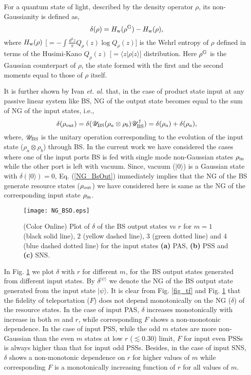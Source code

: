 \documentclass[letter,scriptaddress,twocolumn, prl,showkeys]{revtex4}
\begin{document}
For a quantum state of light, described by the density operator $\rho$, its non-Gaussianity is defined as,
\begin{equation}
\delta(\rho)=H_{\rm{w}}(\rho^{\rm{G}})-H_{\rm{w}}(\rho),
\label{def_ng}
\end{equation} 
where $H_{\rm{w}}(\rho)$ [$=-\int\frac{d^{2}z}{\pi}Q_{\rho}(z)\log Q_{\rho}(z)$] is the Wehrl entropy of $\rho$ defined in terms of the Husimi-Kano $Q_{\rho}(z)$ [$=\langle z|\rho|z\rangle$] distribution.
Here $\rho^{\rm{G}}$ is the Gaussian counterpart of $\rho$, the state formed with the first and the second moments equal to those of $\rho$ itself. 

It is further shown by Ivan \emph{et. al.} \cite{ngm_we} that, in the case of product state input at any passive linear system like BS, NG of the output state becomes equal to the sum of NG of the input states, i.e.,
\begin{equation}
\delta(\rho_{\rm{out}})=\delta(\mathscr{U}_{\rm{BS}}(\rho_{a}\otimes \rho_{b})\mathscr{U}_{\rm{BS}}^{\dagger})=\delta(\rho_{a}) + \delta(\rho_{a}),
\label{NG_BsOut}
\end{equation}
where, $\mathscr{U}_{\rm{BS}}$ is the unitary operation corresponding to the evolution of the input state ($\rho_{a}\otimes \rho_{b}$) through BS.
In the current work we have considered the cases where one of the input ports BS is fed with single mode non-Gaussian states $\rho_{\rm{in}}$ while the other port is left with vacuum.
Since, vacuum ($|0\rangle$) is a Gaussian state with $\delta(|0\rangle)=0$, Eq. (\ref{NG_BsOut}) immediately implies that the NG of the BS generate resource states ($\rho_{\rm{out}}$) we have considered here is same as the NG of the corresponding input state $\rho_{\rm{in}}$. 
\begin{figure}[h]
\texttt{[image: NG\_BSO.eps]}
\caption{(Color Online) Plot of $\delta$ of the BS output states vs $r$ for $m=1$ (black solid line), $2$ (yellow dashed line), $3$ (green dotted line) and $4$ (blue dashed dotted line) for the input states {\bf (a)} PAS, {\bf (b)} PSS and {\bf (c)} SNS. \label{fig_ng}}
\end{figure}

In Fig. \ref{fig_ng} we plot $\delta$ with $r$ for different $m$, for the BS output states generated from different input states. By $\delta^{|\psi\rangle}$ we denote the NG of the BS output state generated from the input state $|\psi\rangle$. 
It is clear from Fig. \ref{fig_tf} and Fig. \ref{fig_ng} that the fidelity of teleportation ($F$) does not depend monotonically on the NG ($\delta$) of the resource states. 
In the case of input PAS, $\delta$ increases monotonically with increase in both $m$ and $r$, while corresponding $F$ shows a non-monotonic dependence. 
In the case of input PSS, while the odd $m$ states are more non-Gaussian than the even $m$ states at low $r$ ($\lesssim 0.30$) limit, $F$ for input even PSSs is always higher than that for input odd PSSs.
Besides, in the case of input SNS, $\delta$ shows a non-monotonic dependence on $r$ for higher values of $m$ while corresponding $F$ is a monotonically increasing function of $r$ for all values of $m$.
\end{document}
